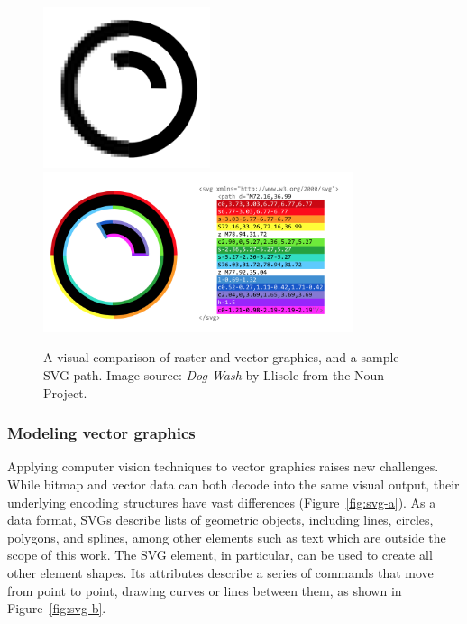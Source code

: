 \begin{figure}[t]
    {\includegraphics[height=1.85in]{figures/b_vs_vec}} \quad
    {\includegraphics[height=1.85in]{figures/svgs}}
    \caption[An overview of vector graphics and Scalable Vector Graphics (SVG)]
    {A visual comparison of raster and vector graphics, and a sample SVG path.
    Image source: \textit{Dog Wash} by Llisole from the Noun Project.\label{fig:svg}}
\end{figure}

\subsubsection{Modeling vector graphics}
Applying computer vision techniques to vector graphics raises new challenges.
While bitmap and vector data can both decode into the same visual output, their underlying encoding structures have vast differences (Figure~\ref{fig:svg-a}).
As a data format, SVGs describe lists of geometric objects, including lines, circles, polygons, and splines, among other elements such as text which are outside the scope of this work.
The SVG  element, in particular, can be used to create all other element shapes.
Its attributes describe a series of commands that move from point to point, drawing curves or lines between them, as shown in Figure~\ref{fig:svg-b}.

